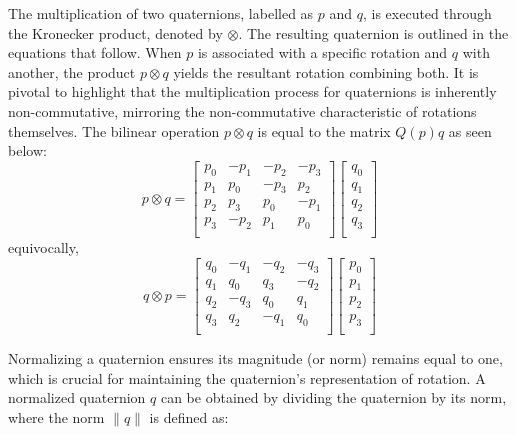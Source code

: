 \documentclass{report}
\begin{document}
The multiplication of two quaternions, labelled as \( p \) and \( q \), is
executed through the Kronecker product, denoted by \( \otimes \). The resulting
quaternion is outlined in the equations that follow. When \( p \) is associated
with a specific rotation and \( q \) with another, the product \( p \otimes q \)
yields the resultant rotation combining both. It is pivotal to highlight that
the multiplication process for quaternions is inherently non-commutative,
mirroring the non-commutative characteristic of rotations themselves. The
bilinear operation \( p \otimes q \) is equal to the matrix \(Q(p)q\) as seen
below:
\begin{equation}
  p \otimes q = 
  \begin{bmatrix}
    p_0 & -p_1 & -p_2 & -p_3 \\
    p_1 & p_0 & -p_3 & p_2 \\
    p_2 & p_3 & p_0 & -p_1 \\
    p_3 & -p_2 & p_1 & p_0 \\
\end{bmatrix}
\begin{bmatrix}
    q_0 \\
    q_1 \\
    q_2 \\
    q_3 \\
\end{bmatrix}
\end{equation}
equivocally, 
\begin{equation}
  q \otimes p = 
  \begin{bmatrix}
    q_0 & -q_1 & -q_2 & -q_3 \\
    q_1 & q_0 & q_3 & -q_2 \\
    q_2 & -q_3 & q_0 & q_1 \\
    q_3 & q_2 & -q_1 & q_0 \\
\end{bmatrix}
\begin{bmatrix}
    p_0 \\
    p_1 \\
    p_2 \\
    p_3 \\
\end{bmatrix}
\end{equation}

Normalizing a quaternion ensures its magnitude (or norm) remains equal to one,
which is crucial for maintaining the quaternion's representation of rotation. A
normalized quaternion \( q \) can be obtained by dividing the quaternion by its
norm, where the norm \( \|q\| \) is defined as:
\end{document}
